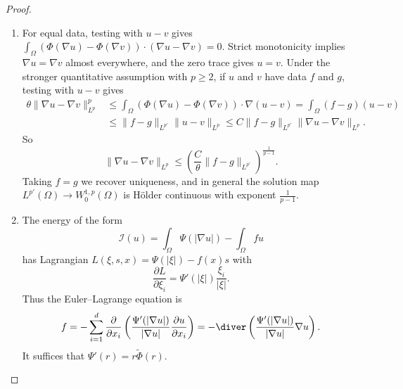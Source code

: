 \begin{proof}
\begin{enumerate}
              We apply the previous point to deduce that
              $$
                  \int_\Omega f \varphi  = \int_\Omega \xi \cdot \nabla \varphi = \int_\Omega \Phi(\nabla v) \cdot \nabla \varphi, \qquad \forall \varphi \in W_0^{1,p}(\Omega).
              $$

        \item For equal data, testing with $u-v$ gives $\int_\Omega(\Phi(\nabla u)-\Phi(\nabla v))\cdot(\nabla u-\nabla v)=0$. Strict monotonicity implies $\nabla u=\nabla v$ almost everywhere, and the zero trace gives $u=v$.
              Under the stronger quantitative assumption with $p\ge2$, if $u$ and $v$ have data $f$ and $g$, testing with $u-v$ gives
              $$
                  \begin{aligned}
                      \theta\|\nabla u-\nabla v\|_{L^p}^p
                      &\le\int_\Omega(\Phi(\nabla u)-\Phi(\nabla v))\cdot\nabla(u-v)
                       =\int_\Omega(f-g)(u-v)\\
                      &\le\|f-g\|_{L^{p'}}\|u-v\|_{L^p}
                       \le C\|f-g\|_{L^{p'}}\|\nabla u-\nabla v\|_{L^p}.
                  \end{aligned}
              $$
              So
              $$
                  \| \nabla u - \nabla v \|_{L^p} \le \left( \frac{C}{\theta}  \| f - g \|_{L^{p'}} \right)^{\frac{1}{p-1}}.
              $$
              Taking $f = g$ we recover uniqueness, and in general the solution map $L^{p'} (\Omega) \to W_0^{1,p}(\Omega)$ is Hölder continuous with exponent $\frac 1 {p-1}$.

        \item The energy of the form
              $$
                  \mathcal I (u) = \int_\Omega \Psi(  |\nabla u|  ) - \int_\Omega fu
              $$
              has Lagrangian $L(\xi,s,x) = \Psi(|\xi|) - f(x) s$ with
              $$
                  \frac{\partial L}{\partial \xi_i} = \Psi'(|\xi|) \frac{\xi_i}{|\xi|}.
              $$
              Thus the Euler--Lagrange equation is
              $$
                  f = -\sum_{i=1}^d \frac{\partial}{\partial x_i} \left(   \frac{\Psi'(|\nabla u|)}{|\nabla u|} \frac{\partial u}{\partial x_i}   \right)  = - \diver \left( \frac{\Psi'(|\nabla u|)}{|\nabla u|} \nabla u \right).
              $$
              It suffices that $\Psi'(r) = r \tilde\Phi(r)$.

    \end{enumerate}
\end{proof}

